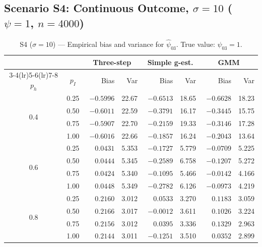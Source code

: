 \documentclass[12pt]{article}
\begin{document}
\subsection{Scenario S4: Continuous Outcome, $\sigma=10$ ($\psi=1$, $n=4000$)}

\begin{table}[htbp]
\centering
\caption{S4 ($\sigma=10$) --- Empirical bias and variance for $\hat\psi_{03}$.
         True value: $\psi_{03}=1$.}
\label{tab:s4_psi03}
\small
\begin{tabular}{cc rr rr rr}
\toprule
& & \multicolumn{2}{c}{Three-step} & \multicolumn{2}{c}{Simple g-est.} & \multicolumn{2}{c}{GMM} \\
\cmidrule(lr){3-4}\cmidrule(lr){5-6}\cmidrule(lr){7-8}
$p_h$ & $p_I$ & Bias & Var & Bias & Var & Bias & Var \\
\midrule
\multirow{4}{*}{0.4}
 & 0.25 & $-0.5996$ & 22.67 & $-0.6513$ & 18.65 & $-0.6628$ & 18.23 \\
 & 0.50 & $-0.6011$ & 22.59 & $-0.3791$ & 16.17 & $-0.3445$ & 15.75 \\
 & 0.75 & $-0.5907$ & 22.70 & $-0.2159$ & 19.33 & $-0.3146$ & 17.28 \\
 & 1.00 & $-0.6016$ & 22.66 & $-0.1857$ & 16.24 & $-0.2043$ & 13.64 \\
\midrule
\multirow{4}{*}{0.6}
 & 0.25 & $\phantom{-}0.0431$ & 5.353 & $-0.1727$ & 5.779 & $-0.0709$ & 5.225 \\
 & 0.50 & $\phantom{-}0.0444$ & 5.345 & $-0.2589$ & 6.758 & $-0.1207$ & 5.272 \\
 & 0.75 & $\phantom{-}0.0424$ & 5.340 & $-0.1095$ & 5.466 & $-0.0142$ & 4.166 \\
 & 1.00 & $\phantom{-}0.0448$ & 5.349 & $-0.2782$ & 6.126 & $-0.0973$ & 4.219 \\
\midrule
\multirow{4}{*}{0.8}
 & 0.25 & $\phantom{-}0.2160$ & 3.012 & $\phantom{-}0.0533$ & 3.270 & $\phantom{-}0.1183$ & 3.059 \\
 & 0.50 & $\phantom{-}0.2166$ & 3.017 & $-0.0012$ & 3.611 & $\phantom{-}0.1026$ & 3.224 \\
 & 0.75 & $\phantom{-}0.2156$ & 3.012 & $\phantom{-}0.0395$ & 3.336 & $\phantom{-}0.1329$ & 2.963 \\
 & 1.00 & $\phantom{-}0.2144$ & 3.011 & $-0.1251$ & 3.510 & $\phantom{-}0.0352$ & 2.899 \\
\bottomrule
\end{tabular}
\end{table}
\end{document}
